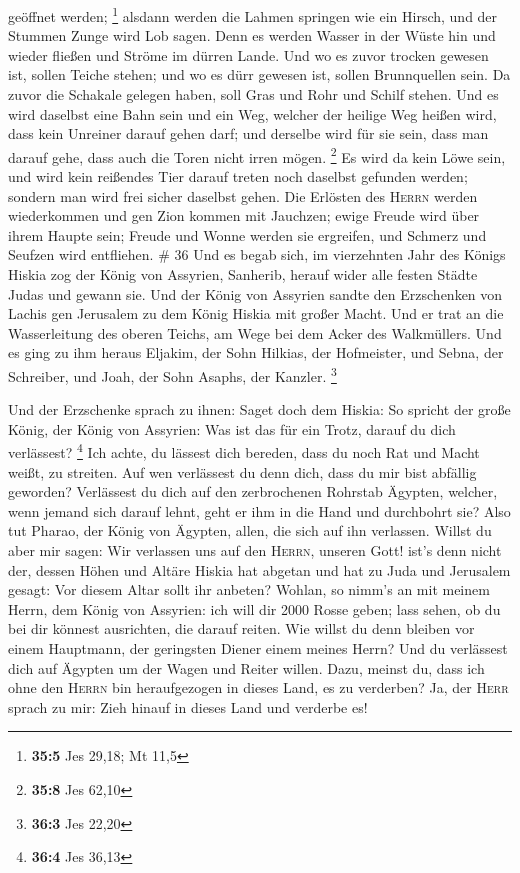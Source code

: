 geöffnet werden; \footnote{\textbf{35:5} Jes 29,18; Mt 11,5}
 alsdann werden die Lahmen springen wie ein Hirsch, und
der Stummen Zunge wird Lob sagen. Denn es werden Wasser in der Wüste hin
und wieder fließen und Ströme im dürren Lande.  Und wo es
zuvor trocken gewesen ist, sollen Teiche stehen; und wo es dürr gewesen
ist, sollen Brunnquellen sein. Da zuvor die Schakale gelegen haben, soll
Gras und Rohr und Schilf stehen.  Und es wird daselbst
eine Bahn sein und ein Weg, welcher der heilige Weg heißen wird, dass
kein Unreiner darauf gehen darf; und derselbe wird für sie sein, dass
man darauf gehe, dass auch die Toren nicht irren mögen. \footnote{\textbf{35:8}
  Jes 62,10}  Es wird da kein Löwe sein, und wird kein
reißendes Tier darauf treten noch daselbst gefunden werden; sondern man
wird frei sicher daselbst gehen.  Die Erlösten des
\textsc{Herrn} werden wiederkommen und gen Zion kommen mit Jauchzen;
ewige Freude wird über ihrem Haupte sein; Freude und Wonne werden sie
ergreifen, und Schmerz und Seufzen wird entfliehen. \# 36 
Und es begab sich, im vierzehnten Jahr des Königs Hiskia zog der König
von Assyrien, Sanherib, herauf wider alle festen Städte Judas und gewann
sie.  Und der König von Assyrien sandte den Erzschenken
von Lachis gen Jerusalem zu dem König Hiskia mit großer Macht. Und er
trat an die Wasserleitung des oberen Teichs, am Wege bei dem Acker des
Walkmüllers.  Und es ging zu ihm heraus Eljakim, der Sohn
Hilkias, der Hofmeister, und Sebna, der Schreiber, und Joah, der Sohn
Asaphs, der Kanzler. \footnote{\textbf{36:3} Jes 22,20}

 Und der Erzschenke sprach zu ihnen: Saget doch dem
Hiskia: So spricht der große König, der König von Assyrien: Was ist das
für ein Trotz, darauf du dich verlässest? \footnote{\textbf{36:4} Jes
  36,13}  Ich achte, du lässest dich bereden, dass du noch
Rat und Macht weißt, zu streiten. Auf wen verlässest du denn dich, dass
du mir bist abfällig geworden?  Verlässest du dich auf den
zerbrochenen Rohrstab Ägypten, welcher, wenn jemand sich darauf lehnt,
geht er ihm in die Hand und durchbohrt sie? Also tut Pharao, der König
von Ägypten, allen, die sich auf ihn verlassen.  Willst du
aber mir sagen: Wir verlassen uns auf den \textsc{Herrn}, unseren Gott!
ist's denn nicht der, dessen Höhen und Altäre Hiskia hat abgetan und hat
zu Juda und Jerusalem gesagt: Vor diesem Altar sollt ihr anbeten?
 Wohlan, so nimm's an mit meinem Herrn, dem König von
Assyrien: ich will dir 2000 Rosse geben; lass sehen, ob du bei dir
könnest ausrichten, die darauf reiten.  Wie willst du denn
bleiben vor einem Hauptmann, der geringsten Diener einem meines Herrn?
Und du verlässest dich auf Ägypten um der Wagen und Reiter willen.
 Dazu, meinst du, dass ich ohne den \textsc{Herrn} bin
heraufgezogen in dieses Land, es zu verderben? Ja, der \textsc{Herr}
sprach zu mir: Zieh hinauf in dieses Land und verderbe es!


